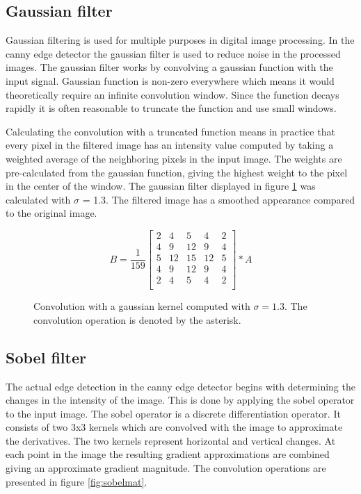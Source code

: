 \subsection{Gaussian filter}
\label{subsec:gauss}
Gaussian filtering is used for multiple purposes in digital image processing. In the canny edge detector the gaussian filter is used to reduce noise in the processed images. The gaussian filter works by convolving a gaussian function with the input signal. Gaussian function is non-zero everywhere which means it would theoretically require an infinite convolution window. Since the function decays rapidly it is often reasonable to truncate the function and use small windows.~\cite{gonzalez2008digital} 

Calculating the convolution with a truncated function means in practice that every pixel in the filtered image has an intensity value computed by taking a weighted average of the neighboring pixels in the input image. The weights are pre-calculated from the gaussian function, giving the highest weight to the pixel in the center of the window. The gaussian filter displayed in figure \ref{fig:gaussmat} was calculated with $\sigma$ = 1.3. The filtered image has a smoothed appearance compared to the original image.

\begin{figure}
    \begin{displaymath}
        B = \frac{1}{159}\begin{bmatrix}
             2 & 4 & 5 & 4 & 2 \\
             4 & 9 & 12 & 9 & 4 \\
             5 & 12 & 15 & 12 & 5 \\
             4 & 9 & 12 & 9 & 4 \\
             2 & 4 & 5 & 4 & 2 \\
        \end{bmatrix} \ast A
    \end{displaymath}
    \caption{Convolution with a gaussian kernel computed with $\sigma = 1.3$. The convolution operation is denoted by the asterisk.}
    \label{fig:gaussmat}
\end{figure}

\subsection{Sobel filter}
\label{subsec:sobel}
The actual edge detection in the canny edge detector begins with determining the changes in the intensity of the image. This is done by applying the sobel operator to the input image. The sobel operator is a discrete differentiation operator. It consists of two 3x3 kernels which are convolved with the image to approximate the derivatives. The two kernels represent horizontal and vertical changes. At each point in the image the resulting gradient approximations are combined giving an approximate gradient magnitude. \cite{gonzalez2008digital} The convolution operations are presented in figure \ref{fig:sobelmat}.

